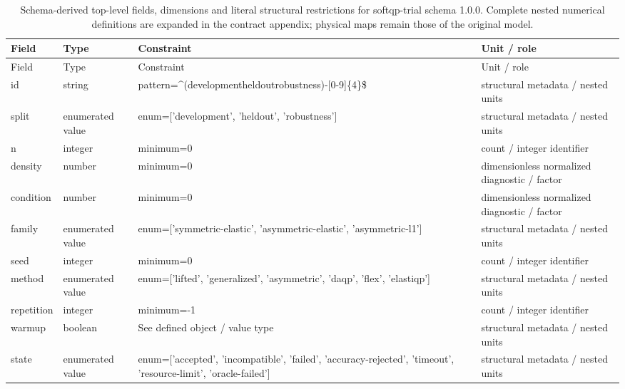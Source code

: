 \begingroup\footnotesize
\begin{longtable}{@{}>{\raggedright\arraybackslash}p{}>{\raggedright\arraybackslash}p{}>{\raggedright\arraybackslash}p{}>{\raggedright\arraybackslash}p{}@{}}
\caption{Schema-derived top-level fields, dimensions and literal structural restrictions for softqp-trial schema 1.0.0. Complete nested numerical definitions are expanded in the contract appendix; physical maps remain those of the original model.}\label{tab:contract-softqp-trial}\\
\toprule Field & Type & Constraint & Unit / role\\\midrule\endfirsthead
\toprule Field & Type & Constraint & Unit / role\\\midrule\endhead
\bottomrule\endfoot
id & string & pattern=\allowbreak{}\textasciicircum{}(development\textbar{}\allowbreak{}heldout\textbar{}\allowbreak{}robustness)-[0-9]\{4\}\$ & structural metadata /\allowbreak{} nested units\\
split & enumerated value & enum=\allowbreak{}['development', 'heldout', 'robustness'] & structural metadata /\allowbreak{} nested units\\
n & integer & minimum=\allowbreak{}0 & count /\allowbreak{} integer identifier\\
density & number & minimum=\allowbreak{}0 & dimensionless normalized diagnostic /\allowbreak{} factor\\
condition & number & minimum=\allowbreak{}0 & dimensionless normalized diagnostic /\allowbreak{} factor\\
family & enumerated value & enum=\allowbreak{}['symmetric-\allowbreak{}elastic', 'asymmetric-\allowbreak{}elastic', 'asymmetric-\allowbreak{}l1'] & structural metadata /\allowbreak{} nested units\\
seed & integer & minimum=\allowbreak{}0 & count /\allowbreak{} integer identifier\\
method & enumerated value & enum=\allowbreak{}['lifted', 'generalized', 'asymmetric', 'daqp', 'flex', 'elastiqp'] & structural metadata /\allowbreak{} nested units\\
repetition & integer & minimum=\allowbreak{}-1 & count /\allowbreak{} integer identifier\\
warmup & boolean & See defined object /\allowbreak{} value type & structural metadata /\allowbreak{} nested units\\
state & enumerated value & enum=\allowbreak{}['accepted', 'incompatible', 'failed', 'accuracy-\allowbreak{}rejected', 'timeout', 'resource-\allowbreak{}limit', 'oracle-\allowbreak{}failed'] & structural metadata /\allowbreak{} nested units\\

\end{longtable}
